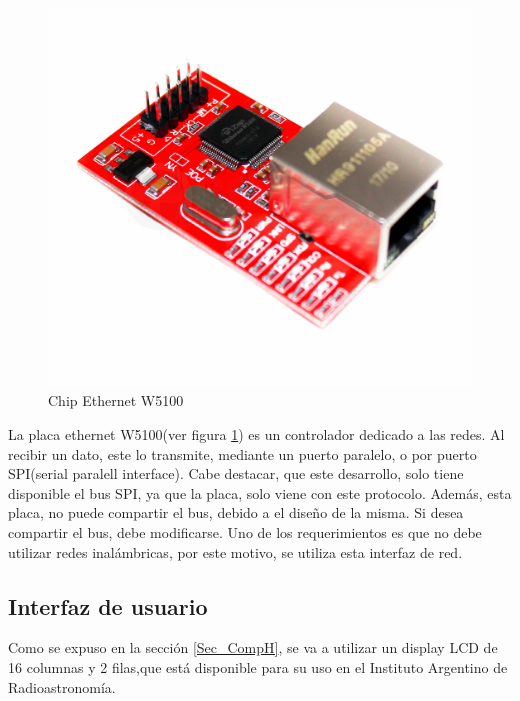\begin{figure}[ht]
	\centering	
	\includegraphics[scale=.2]{w5100}  
	\caption{Chip Ethernet W5100}		 
	\label{fig:chip_ethernet}
\end{figure}

La placa ethernet W5100(ver figura \ref{fig:chip_ethernet}) es un controlador dedicado a las redes. Al recibir un dato, este lo transmite, mediante un puerto paralelo, o por puerto SPI(serial paralell interface). Cabe destacar, que este desarrollo, solo tiene disponible el bus SPI, ya que la placa, solo viene con este protocolo. Además, esta placa, no puede compartir el bus, debido a el diseño de la misma. Si desea compartir el bus, debe modificarse. Uno de los requerimientos es que no debe utilizar redes inalámbricas, por este motivo, se utiliza esta interfaz de red. 

\subsection{Interfaz de usuario} \label{Int_u}
Como se expuso en la sección \ref{Sec_CompH}, se va a utilizar un display LCD de 16 columnas y 2 filas,que está disponible para su uso en el Instituto Argentino de Radioastronomía.  
 
